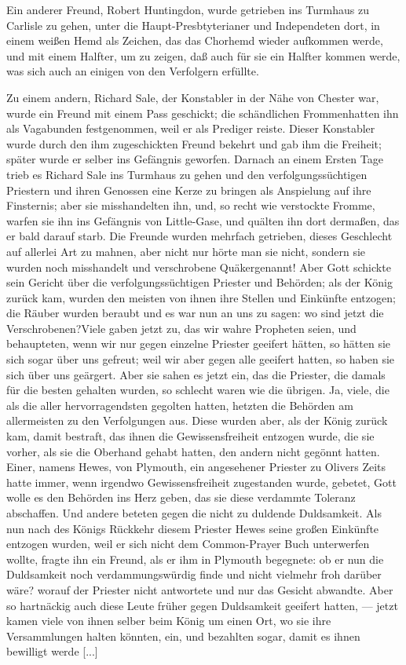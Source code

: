 Ein anderer Freund, Robert Huntingdon, wurde getrieben
ins Turmhaus zu Carlisle zu gehen, unter die Haupt-Presbtyterianer 
und Independeten dort, in einem weißen Hemd als
Zeichen, das das Chorhemd wieder aufkommen werde, und mit
einem Halfter, um zu zeigen, daß auch für sie ein Halfter kommen
werde, was sich auch an einigen von den Verfolgern erfüllte.

Zu einem andern, Richard Sale, der Konstabler in der Nähe
von Chester war, wurde ein Freund mit einem Pass geschickt;
die schändlichen \glqq Frommen\grqq hatten ihn als Vagabunden 
festgenommen, weil er als Prediger reiste. Dieser Konstabler wurde
durch den ihm zugeschickten Freund bekehrt und gab ihm die
Freiheit; später wurde er selber ins Gefängnis geworfen. Darnach
an einem Ersten Tage trieb es Richard Sale ins Turmhaus zu
gehen und den verfolgungssüchtigen Priestern und ihren Genossen
eine Kerze zu bringen als Anspielung auf ihre Finsternis; aber
sie misshandelten ihn, und, so recht wie verstockte \glqq Fromme\grqq, warfen
sie ihn ins Gefängnis von Little-Gase, und quälten ihn dort dermaßen,
das er bald darauf starb. Die Freunde wurden mehrfach getrieben, 
dieses Geschlecht auf allerlei Art zu mahnen, aber nicht
nur hörte man sie nicht, sondern sie wurden noch misshandelt und
\glqq verschrobene Quäker\grqq genannt! Aber Gott schickte sein Gericht
über die verfolgungssüchtigen Priester und Behörden; als der
König zurück kam, wurden den meisten von ihnen ihre Stellen und
Einkünfte entzogen; die Räuber wurden beraubt und es war nun
an uns zu sagen: \glqq wo sind jetzt die Verschrobenen?\grqq Viele gaben
jetzt zu, das wir wahre Propheten seien, und behaupteten, wenn
wir nur gegen einzelne Priester geeifert hätten, so hätten sie sich
sogar über uns gefreut; weil wir aber gegen alle geeifert hatten,
so haben sie sich über uns geärgert. Aber sie sahen es jetzt ein,
das die Priester, die damals für die besten gehalten wurden, so
schlecht waren wie die übrigen. Ja, viele, die als die aller 
hervorragendsten gegolten hatten, hetzten die Behörden am 
allermeisten zu den Verfolgungen aus. Diese wurden aber, als der
König zurück kam, damit bestraft, das ihnen die Gewissensfreiheit
entzogen wurde, die sie vorher, als sie die Oberhand gehabt hatten,
den andern nicht gegönnt hatten. Einer, namens Hewes, von
Plymouth, ein angesehener Priester zu Olivers Zeits hatte immer,
wenn irgendwo Gewissensfreiheit zugestanden wurde, gebetet, Gott
wolle es den Behörden ins Herz geben, das sie diese verdammte
Toleranz abschaffen. Und andere beteten gegen \glqq die nicht zu
duldende Duldsamkeit\grqq. Als nun nach des Königs Rückkehr
diesem Priester Hewes seine großen Einkünfte entzogen wurden,
weil er sich nicht dem Common-Prayer Buch unterwerfen wollte,
fragte ihn ein Freund, als er ihm in Plymouth begegnete: ob er
nun die Duldsamkeit noch verdammungswürdig finde und nicht
vielmehr froh darüber wäre? worauf der Priester nicht antwortete
und nur das Gesicht abwandte. Aber so hartnäckig auch diese
Leute früher gegen Duldsamkeit geeifert hatten, — jetzt kamen
viele von ihnen selber beim König um einen Ort, wo sie ihre
Versammlungen halten könnten, ein, und bezahlten sogar, damit
es ihnen bewilligt werde [...]

